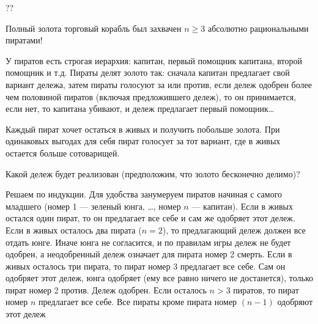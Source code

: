 \begin{problem}  \par
\begin{source}
\cite{mulen:gt}??
\end{source}
Полный золота торговый корабль был захвачен  $n\ge 3$  абсолютно рациональными пиратами! \par
У пиратов есть строгая иерархия: капитан, первый помощник капитана, второй помощник и т.д. Пираты делят золото так: сначала капитан предлагает свой вариант дележа, затем пираты голосуют за или против, если дележ одобрен более чем половиной пиратов (включая предложившего дележ), то он принимается, если нет, то капитана убивают, и дележ предлагает первый помощник\ldots \par
Каждый пират хочет остаться в живых и получить побольше золота. При одинаковых выгодах для себя пират голосует за тот вариант, где в живых остается больше сотоварищей.\par
Какой дележ будет реализован (предположим, что золото бесконечно делимо)?

\begin{sol}
Решаем по индукции. Для удобства занумеруем пиратов начиная с самого младшего (номер 1 --- зеленый юнга, \ldots, номер $n$ --- капитан). Если в живых остался один пират, то он предлагает все себе и сам же одобряет этот дележ. Если в живых осталось два пирата ($n=2$), то предлагающий дележ должен все отдать юнге. Иначе юнга не согласится, и по правилам игры дележ не будет одобрен, а неодобренный дележ означает для пирата номер 2 смерть. Если в живых осталось три пирата, то пират номер 3 предлагает все себе. Сам он одобряет этот дележ, юнга одобряет (ему все равно ничего не достанется), только пират номер 2 против. Дележ одобрен. Если осталось $n>3$ пиратов, то пират номер $n$ предлагает все себе. Все пираты кроме пирата номер $(n-1)$ одобряют этот дележ
\end{sol}
\end{problem}






